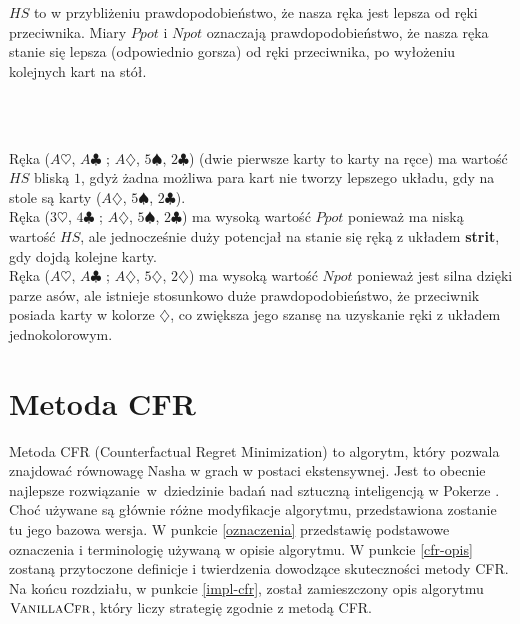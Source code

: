 \documentclass[magisterska]{pracamgr}
\newenvironment{example}[1][Przykład]{\begin{trivlist}
\item[\hskip \labelsep {\bfseries #1}]}{\end{trivlist}}
\begin{document}
\noindent
$HS$ to w przybliżeniu prawdopodobieństwo, że nasza ręka jest lepsza od ręki przeciwnika. Miary $Ppot$ i $Npot$ oznaczają
prawdopodobieństwo, że nasza ręka stanie się lepsza (odpowiednio gorsza) od ręki przeciwnika, po wyłożeniu kolejnych kart na stół. \\

\begin{example}
$\,$ \\\\
\noindent

\noindent
Ręka ($A\heartsuit$, $A\clubsuit$ ; $A\diamondsuit$, $5\spadesuit$, $2\clubsuit$) (dwie pierwsze karty to karty na ręce) ma wartość $HS$
bliską $1$, gdyż żadna możliwa para kart nie tworzy lepszego układu, gdy na stole są karty ($A\diamondsuit$, $5\spadesuit$, $2\clubsuit$). \\

\noindent
Ręka ($3\heartsuit$, $4\clubsuit$ ; $A\diamondsuit$, $5\spadesuit$, $2\clubsuit$) ma wysoką wartość $Ppot$ ponieważ ma niską wartość $HS$,
ale jednocześnie duży potencjał na stanie się ręką z układem \textbf{strit}, gdy dojdą kolejne karty. \\

\noindent
Ręka ($A\heartsuit$, $A\clubsuit$ ; $A\diamondsuit$, $5\diamondsuit$, $2\diamondsuit$) ma wysoką wartość $Npot$ ponieważ jest silna
dzięki parze asów, ale istnieje stosunkowo duże prawdopodobieństwo, że przeciwnik posiada karty w kolorze $\diamondsuit$, co zwiększa jego szansę
na uzyskanie ręki z układem jednokolorowym.

\end{example}


\chapter{Metoda CFR}

Metoda CFR (Counterfactual Regret Minimization) to algorytm, który pozwala znajdować równowagę Nasha
w grach w postaci ekstensywnej. Jest to obecnie najlepsze rozwiązanie~w~dziedzinie badań nad
sztuczną inteligencją w Pokerze \cite{cfr}. Choć używane są głównie różne modyfikacje algorytmu,
przedstawiona zostanie tu jego bazowa wersja. W punkcie \ref{oznaczenia} przedstawię podstawowe oznaczenia i terminologię
używaną w opisie algorytmu. W punkcie \ref{cfr-opis} zostaną przytoczone definicje i twierdzenia dowodzące skuteczności metody
CFR. Na końcu rozdziału, w punkcie \ref{impl-cfr}, został zamieszczony opis algorytmu $\Call{VanillaCfr}{}$, który liczy strategię zgodnie z metodą CFR.
\end{document}
